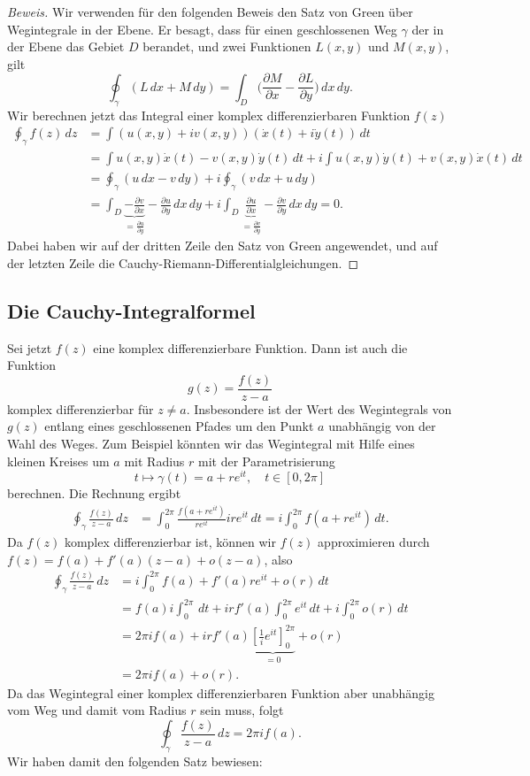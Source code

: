 \begin{proof}[Beweis]
Wir verwenden für den folgenden Beweis den Satz von Green über
%
Wegintegrale in der Ebene.
Er besagt, dass für einen geschlossenen Weg $\gamma$ der in der Ebene
das Gebiet $D$ berandet, und zwei Funktionen $L(x,y)$ und $M(x,y)$, gilt
\[
\oint_\gamma(L\,dx + M\,dy)
=
\int_D \biggl(\frac{\partial M}{\partial x}
-\frac{\partial L}{\partial y}\biggr)\,dx\,dy.
\]
Wir berechnen jetzt das Integral einer komplex differenzierbaren Funktion
$f(z)$
\begin{align*}
\oint_\gamma f(z)\,dz
&=
\int (u(x,y)+iv(x,y))(\dot x(t)+i\dot y(t))\,dt
\\
&=
\int u(x,y)\dot x(t) -v(x,y)\dot y(t)\,dt
+
i \int u(x,y)\dot y(t)+v(x,y)\dot x(t)\,dt
\\
&=\oint_\gamma(u\,dx - v\,dy) + i\oint_\gamma(v\,dx + u\,dy)
\\
&=
\int_D
\underbrace{-\frac{\partial v}{\partial x}}_{\displaystyle=\frac{\partial u}{\partial y}}
-\frac{\partial u}{\partial y}
\,dx\,dy
+i
\int_D
\underbrace{\frac{\partial u}{\partial x}}_{\displaystyle=\frac{\partial v}{\partial y}}
-\frac{\partial v}{\partial y}\,dx\,dy
=0.
\end{align*}
Dabei haben wir auf der dritten Zeile den Satz von Green angewendet,
und auf der letzten Zeile die Cauchy-Riemann-Differentialgleichungen.
\end{proof}

%
%
\subsection{Die Cauchy-Integralformel}
%
Sei jetzt $f(z)$ eine komplex differenzierbare Funktion.
Dann ist auch die Funktion
\[
g(z)=\frac{f(z)}{z-a}
\]
komplex differenzierbar für $z\ne a$.
Insbesondere ist der Wert des Wegintegrals von $g(z)$ entlang
eines geschlossenen Pfades um den Punkt $a$ unabhängig von der Wahl
des Weges.
Zum Beispiel könnten wir das Wegintegral mit Hilfe eines kleinen Kreises
um $a$ mit Radius $r$ mit der Parametrisierung
\[
t\mapsto \gamma(t)=a+re^{it},\quad t\in[0,2\pi]
\]
berechnen.
Die Rechnung ergibt
\begin{align*}
\oint_\gamma \frac{f(z)}{z-a}\,dz
&=
\int_0^{2\pi} \frac{f(a+re^{it})}{re^{it}}ire^{it}\,dt
=
i\int_0^{2\pi} f(a+re^{it})\,dt.
\end{align*}
Da $f(z)$ komplex differenzierbar ist, können wir $f(z)$ approximieren
durch $f(z)=f(a)+f'(a)(z-a)+o(z-a)$, also
\begin{align*}
\oint_{\gamma} \frac{f(z)}{z-a}\,dz
&=
i\int_0^{2\pi}f(a) + f'(a)re^{it}+o(r)\,dt
\\
&=
f(a)i\int_0^{2\pi}\,dt
+ irf'(a)\int_0^{2\pi} e^{it}\,dt + i\int_0^{2\pi}o(r)\,dt
\\
&=
2\pi i f(a) + irf'(a)\underbrace{\left[\frac1{i}e^{it}\right]_0^{2\pi}}_{\displaystyle=0}+o(r)
\\
&=2\pi i f(a)+o(r).
\end{align*}
Da das Wegintegral einer komplex differenzierbaren Funktion aber unabhängig
vom Weg und damit vom Radius $r$ sein muss, folgt
\[
\oint_\gamma \frac{f(z)}{z-a}\,dz=2\pi i f(a).
\]
Wir haben damit den folgenden Satz bewiesen:

